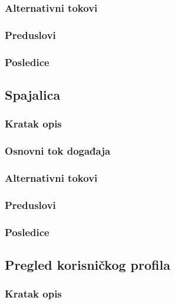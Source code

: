 \subsubsection{Alternativni tokovi}

\subsubsection{Preduslovi}

\subsubsection{Posledice}




\subsection{Spajalica}
\label{subsec:spajalica}

\subsubsection{Kratak opis}

\subsubsection{Osnovni tok događaja}

\subsubsection{Alternativni tokovi}

\subsubsection{Preduslovi}

\subsubsection{Posledice}



\subsection{Pregled korisničkog profila}
\label{subsec:pregled-korisnickog-profila}

\subsubsection{Kratak opis}

